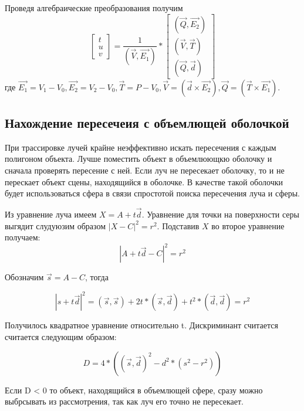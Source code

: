 \documentclass[12pt,a4paper,oneside]{report}
\begin{document}
    			\quad Проведя алгебраические преобразования получим
    			\[
    				\begin{bmatrix}
						t\\
						u\\
						v
					\end{bmatrix}
					= \frac{1}{(\vec{V}, \vec{E_{1}})}*
					\begin{bmatrix}
						(\vec{Q}, \vec{E_{2}})\\
						(\vec{V}, \vec{T})\\
						(\vec{Q}, \vec{d})
					\end{bmatrix}
				\]
				\quad где $\vec{E_{1}} = V_{1} - V_{0}, \vec{E_{2}} = V_{2} - V_{0}, \vec{T} = P - V_{0}, \vec{V} = (\vec{d} \times \vec{E_{2}}), \vec{Q} = (\vec{T} \times \vec{E_{1}})$.
			\subsection{Нахождение пересечеия с объемлющей оболочкой}
				\quad При трассировке лучей крайне неэффективно искать пересечения с каждым полигоном объекта. Лучше поместить объект в объемлюющкю оболочку и сначала проверять пересение с ней. Если луч не пересекает оболочку, то и не перескает объект сцены, находящийся в оболочке. В качестве такой оболочки будет использоваться сфера в связи спростотой поиска пересечения луча и сферы.	
				
				\quad Из уравнение луча имеем $X = A + t\vec{d}$. Уравнение для точки на поверхности серы выгядит слудуюзим образом $|X - C|^2 = r^2$. Подставив $X$ во второе уравнение получаем: 
				\[
    				|A + t\vec{d} - C|^2 = r^2
				\]
				
				\quad Обозначим $\vec{s} = A - C$, тогда
				
				\[
    				|s + t\vec{d}|^2 = (\vec{s}, \vec{s}) + 2t*(\vec{s}, \vec{d}) + t^2*(\vec{d}, \vec{d}) = r^2
				\]
				
				\quad Получилось квадратное уравнение относительно t. Дискриминант считается считается следующим образом:
				
				\[
    				D = 4*((\vec{s}, \vec{d})^2 - d^2*(s^2 - r^2))    				
				\]
				
				
				\quad Если D < 0 то объект, находящийся в объемлющей сфере, сразу можно выбрсывать из рассмотрения, так как луч его точно не пересекает.
				
\end{document}
